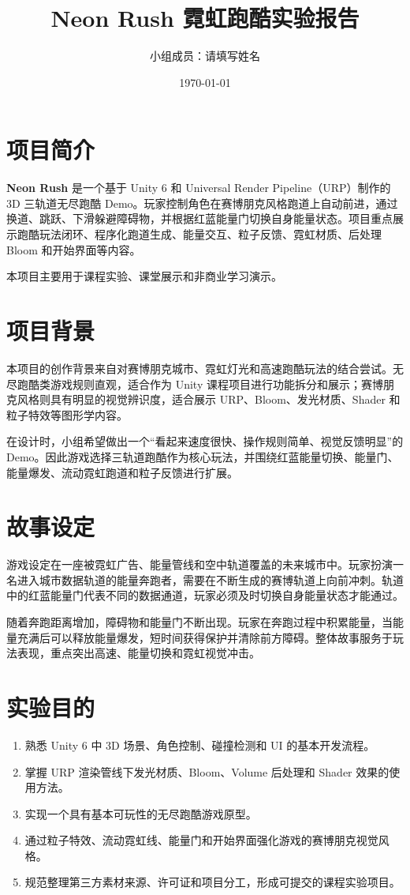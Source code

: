 \documentclass[UTF8,a4paper,12pt]{ctexart}
\title{\textbf{Neon Rush 霓虹跑酷实验报告}}
\author{小组成员：请填写姓名}
\date{\today}
\begin{document}
\maketitle

\section{项目简介}

\textbf{Neon Rush} 是一个基于 Unity 6 和 Universal Render Pipeline（URP）制作的 3D 三轨道无尽跑酷 Demo。玩家控制角色在赛博朋克风格跑道上自动前进，通过换道、跳跃、下滑躲避障碍物，并根据红蓝能量门切换自身能量状态。项目重点展示跑酷玩法闭环、程序化跑道生成、能量交互、粒子反馈、霓虹材质、后处理 Bloom 和开始界面等内容。

本项目主要用于课程实验、课堂展示和非商业学习演示。

\section{项目背景}

本项目的创作背景来自对赛博朋克城市、霓虹灯光和高速跑酷玩法的结合尝试。无尽跑酷类游戏规则直观，适合作为 Unity 课程项目进行功能拆分和展示；赛博朋克风格则具有明显的视觉辨识度，适合展示 URP、Bloom、发光材质、Shader 和粒子特效等图形学内容。

在设计时，小组希望做出一个“看起来速度很快、操作规则简单、视觉反馈明显”的 Demo。因此游戏选择三轨道跑酷作为核心玩法，并围绕红蓝能量切换、能量门、能量爆发、流动霓虹跑道和粒子反馈进行扩展。

\section{故事设定}

游戏设定在一座被霓虹广告、能量管线和空中轨道覆盖的未来城市中。玩家扮演一名进入城市数据轨道的能量奔跑者，需要在不断生成的赛博轨道上向前冲刺。轨道中的红蓝能量门代表不同的数据通道，玩家必须及时切换自身能量状态才能通过。

随着奔跑距离增加，障碍物和能量门不断出现。玩家在奔跑过程中积累能量，当能量充满后可以释放能量爆发，短时间获得保护并清除前方障碍。整体故事服务于玩法表现，重点突出高速、能量切换和霓虹视觉冲击。

\section{实验目的}

\begin{enumerate}
  \item 熟悉 Unity 6 中 3D 场景、角色控制、碰撞检测和 UI 的基本开发流程。
  \item 掌握 URP 渲染管线下发光材质、Bloom、Volume 后处理和 Shader 效果的使用方法。
  \item 实现一个具有基本可玩性的无尽跑酷游戏原型。
  \item 通过粒子特效、流动霓虹线、能量门和开始界面强化游戏的赛博朋克视觉风格。
  \item 规范整理第三方素材来源、许可证和项目分工，形成可提交的课程实验项目。
\end{enumerate}
\end{document}
